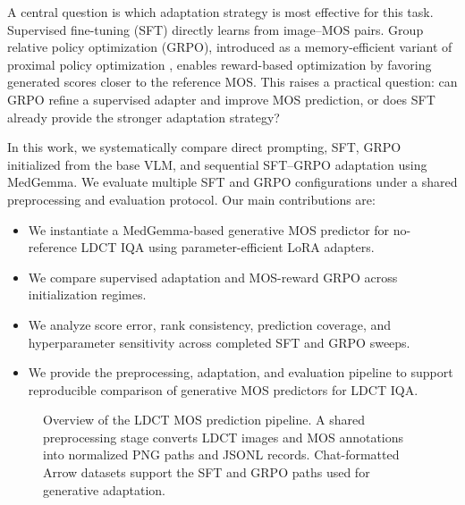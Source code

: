 A central question is which adaptation strategy is most effective for this task. Supervised fine-tuning (SFT) directly learns from image--MOS pairs. Group relative policy optimization (GRPO), introduced as a memory-efficient variant of proximal policy optimization \cite{schulman2017ppo,shao2024deepseekmath}, enables reward-based optimization by favoring generated scores closer to the reference MOS. This raises a practical question: can GRPO refine a supervised adapter and improve MOS prediction, or does SFT already provide the stronger adaptation strategy?

In this work, we systematically compare direct prompting, SFT, GRPO initialized from the base VLM, and sequential SFT--GRPO adaptation using MedGemma. We evaluate multiple SFT and GRPO configurations under a shared preprocessing and evaluation protocol. Our main contributions are:
\begin{itemize}
  \item We instantiate a MedGemma-based generative MOS predictor for no-reference LDCT IQA using parameter-efficient LoRA adapters.
  \item We compare supervised adaptation and MOS-reward GRPO across initialization regimes.
  \item We analyze score error, rank consistency, prediction coverage, and hyperparameter sensitivity across completed SFT and GRPO sweeps.
  \item We provide the preprocessing, adaptation, and evaluation pipeline to support reproducible comparison of generative MOS predictors for LDCT IQA.
\end{itemize}

\begin{figure}[t]
  \centering
  \resizebox{\textwidth}{!}{}
  \caption{Overview of the LDCT MOS prediction pipeline. A shared preprocessing stage converts LDCT images and MOS annotations into normalized PNG paths and JSONL records. Chat-formatted Arrow datasets support the SFT and GRPO paths used for generative adaptation.}
  \label{fig:training-pipeline}
\end{figure}
